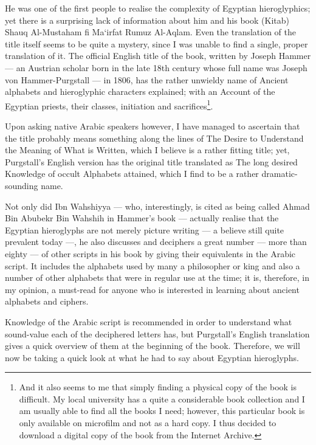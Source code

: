 \documentclass[a5paper,twoside,11pt]{report}
\begin{document}
	He was one of the first people to realise the complexity of Egyptian hieroglyphics; yet there is a surprising lack of information about him and his book (Kitab) Shauq Al-Mustaham fi Ma‘irfat Rumuz Al-Aqlam. Even the translation of the title itself seems to be quite a mystery, since I was unable to find a single, proper translation of it. The official English title of the book, written by Joseph Hammer — an Austrian scholar born in the late 18th century whose full name was Joseph von Hammer-Purgstall — in 1806, has the rather unwieldy name of Ancient alphabets and hieroglyphic characters explained; with an Account of the Egyptian priests, their classes, initiation and sacrifices\footnote{And it also seems to me that simply finding a physical copy of the book is difficult. My local university has a quite a considerable book collection and I am usually able to find all the books I need; however, this particular book is only available on microfilm and not as a hard copy. I thus decided to download a digital copy of the book from the Internet Archive.}.

	Upon asking native Arabic speakers however, I have managed to ascertain that the title probably means something along the lines of The Desire to Understand the Meaning of What is Written, which I believe is a rather fitting title; yet, Purgstall’s English version has the original title translated as The long desired Knowledge of occult Alphabets attained, which I find to be a rather dramatic-sounding name. 

	Not only did Ibn Wahshiyya — who, interestingly, is cited as being called Ahmad Bin Abubekr Bin Wahshih in Hammer’s book — actually realise that the Egyptian hieroglyphs are not merely picture writing — a believe still quite prevalent today —, he also discusses and deciphers a great number — more than eighty — of other scripts in his book by giving their equivalents in the Arabic script. It includes the alphabets used by many a philosopher or king and also a number of other alphabets that were in regular use at the time; it is, therefore, in my opinion, a must-read for anyone who is interested in learning about ancient alphabets and ciphers. 

	Knowledge of the Arabic script is recommended in order to understand what sound-value each of the deciphered letters has, but Purgstall's English translation gives a quick overview of them at the beginning of the book. Therefore, we will now be taking a quick look at what he had to say about Egyptian hieroglyphs.
\end{document}
